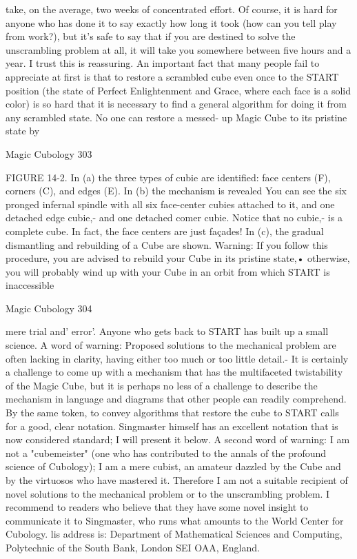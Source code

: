 take, on the average, two weeks of concentrated effort. Of course, it is hard for
anyone who has done it to say exactly how long it took (how can you tell play from
work?), but it's safe to say that if you are destined to solve the unscrambling problem
at all, it will take you somewhere between five hours and a year. I trust this is
reassuring.
        An important fact that many people fail to appreciate at first is that to restore a
scrambled cube even once to the START position (the state of Perfect Enlightenment
and Grace, where each face is a solid color) is so hard that it is necessary to find a
general algorithm for doing it from any scrambled state. No one can restore a messed-
up Magic Cube to its pristine state by




Magic Cubology                                                                         303

FIGURE 14-2. In (a) the three types of cubie are identified: face centers (F), corners
(C), and edges (E). In (b) the mechanism is revealed You can see the six pronged
infernal spindle with all six face-center cubies attached to it, and one detached edge
cubie,- and one detached comer cubie. Notice that no cubie,- is a complete cube. In
fact, the face centers are just façades! In (c), the gradual dismantling and rebuilding
of a Cube are shown. Warning: If you follow this procedure, you are advised to
rebuild your Cube in its pristine state,• otherwise, you will probably wind up with
your Cube in an orbit from which START is inaccessible




Magic Cubology                                                                     304

 mere trial and' error'. Anyone who gets back to START has built up a small science.
        A word of warning: Proposed solutions to the mechanical problem are often
lacking in clarity, having either too much or too little detail.- It is certainly a challenge
to come up with a mechanism that has the multifaceted twistability of the Magic
Cube, but it is perhaps no less of a challenge to describe the mechanism in language
and diagrams that other people can readily comprehend. By the same token, to convey
algorithms that restore the cube to START calls for a good, clear notation. Singmaster
himself has an excellent notation that is now considered standard; I will present it
below. A second word of warning: I am not a "cubemeister" (one who has contributed
to the annals of the profound science of Cubology); I am a mere cubist, an amateur
dazzled by the Cube and by the virtuosos who have mastered it. Therefore I am not a
suitable recipient of novel solutions to the mechanical problem or to the unscrambling
problem. I recommend to readers who believe that they have some novel insight to
communicate it to Singmaster, who runs what amounts to the World Center for
Cubology. lis address is: Department of Mathematical Sciences and Computing,
Polytechnic of the South Bank, London SEI OAA, England.

